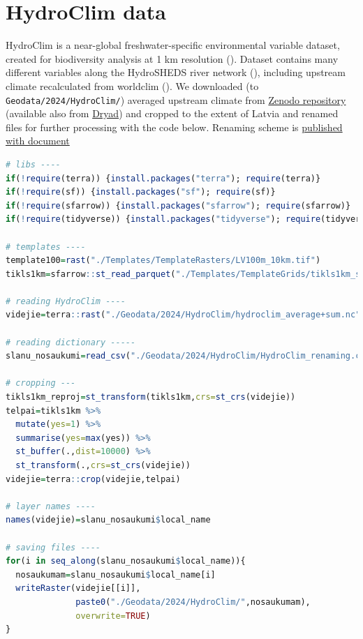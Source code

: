 \documentclass[
]{book}
\newcommand{\passthrough}[1]{#1}
\begin{document}
\section{HydroClim data}\label{Ch04.12}

HydroClim is a near-global freshwater-specific environmental variable dataset,
created for biodiversity analysis at 1 km resolution (). Dataset
contains many different variables along the HydroSHEDS river
network (), including upstream climate recalculated from
worldclim (). We downloaded (to \passthrough{\lstinline!Geodata/2024/HydroClim/!})
averaged upstream climate from \href{https://zenodo.org/records/5089529}{Zenodo repository}
(available also from \href{https://datadryad.org/dataset/doi:10.5061/dryad.dv920}{Dryad})
and cropped to the extent of Latvia and renamed files for further processing
with the code below. Renaming scheme is \href{https://github.com/aavotins/HiQBioDiv_EGVs/blob/main/Data/Geodata/2024/HydroClim/HydroClim_renaming.csv}{published with document}

\begin{lstlisting}[language=R]
# libs ----
if(!require(terra)) {install.packages("terra"); require(terra)}
if(!require(sf)) {install.packages("sf"); require(sf)}
if(!require(sfarrow)) {install.packages("sfarrow"); require(sfarrow)}
if(!require(tidyverse)) {install.packages("tidyverse"); require(tidyverse)}

# templates ----
template100=rast("./Templates/TemplateRasters/LV100m_10km.tif")
tikls1km=sfarrow::st_read_parquet("./Templates/TemplateGrids/tikls1km_sauzeme.parquet")

# reading HydroClim ----
videjie=terra::rast("./Geodata/2024/HydroClim/hydroclim_average+sum.nc")

# reading dictionary -----
slanu_nosaukumi=read_csv("./Geodata/2024/HydroClim/HydroClim_renaming.csv")

# cropping ---
tikls1km_reproj=st_transform(tikls1km,crs=st_crs(videjie))
telpai=tikls1km %>% 
  mutate(yes=1) %>% 
  summarise(yes=max(yes)) %>% 
  st_buffer(.,dist=10000) %>% 
  st_transform(.,crs=st_crs(videjie))
videjie=terra::crop(videjie,telpai)

# layer names ----
names(videjie)=slanu_nosaukumi$local_name

# saving files ----
for(i in seq_along(slanu_nosaukumi$local_name)){
  nosaukumam=slanu_nosaukumi$local_name[i]
  writeRaster(videjie[[i]],
              paste0("./Geodata/2024/HydroClim/",nosaukumam),
              overwrite=TRUE)
}
\end{lstlisting}
\end{document}
